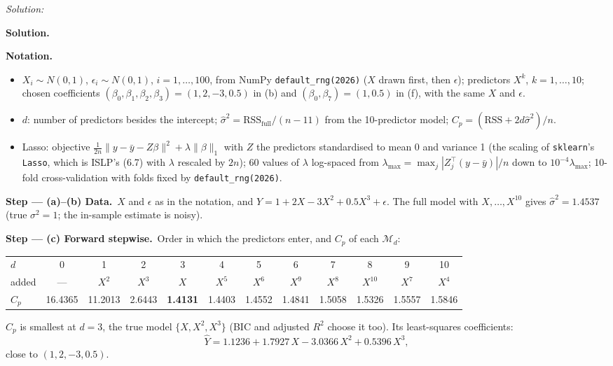 \documentclass[11pt,a4paper]{article}
\newif\ifsolucoes
\newcommand{\espacoresol}{4.5cm}   %
\numberwithin{equation}{questao}   %
\newenvironment{notacao}{\par\smallskip\noindent\textbf{Notation.}\begin{itemize}[leftmargin=1.4em,topsep=1pt,itemsep=0pt]\small}{\end{itemize}}
\newcommand{\resolespaco}{\ifsolucoes\else\par\textit{Solution:}\vspace{\espacoresol}\par\fi}
\newcommand{\passo}[2]{\par\smallskip\noindent\textbf{Step --- #1.}~#2}
\newcommand{\solhead}{\par\medskip\noindent{\color{blue!55!black}\rule{\linewidth}{0.3pt}}\par\noindent\textbf{Solution.}}
\begin{document}
\resolespaco
\begin{sol}
\solhead
\begin{notacao}
\item $X_i\sim N(0,1)$, $\epsilon_i\sim N(0,1)$, $i=1,\dots,100$, from NumPy \texttt{default\_rng(2026)}
  ($X$ drawn first, then $\epsilon$); predictors $X^k$, $k=1,\dots,10$; chosen coefficients
  $(\beta_0,\beta_1,\beta_2,\beta_3)=(1,2,-3,0.5)$ in (b) and $(\beta_0,\beta_7)=(1,0.5)$ in (f), with the
  same $X$ and $\epsilon$.
\item $d$: number of predictors besides the intercept; $\hat\sigma^2=\mathrm{RSS}_{\text{full}}/(n-11)$ from
  the 10-predictor model; $C_p=(\mathrm{RSS}+2d\hat\sigma^2)/n$.
\item Lasso: objective $\frac1{2n}\lVert y-\bar y-Z\beta\rVert^2+\lambda\lVert\beta\rVert_1$ with $Z$ the predictors
  standardised to mean 0 and variance 1 (the scaling of \texttt{sklearn}'s \texttt{Lasso}, which is
  ISLP's (6.7) with $\lambda$ rescaled by $2n$); 60 values of $\lambda$ log-spaced from
  $\lambda_{\max}=\max_j|Z_j^\top(y-\bar y)|/n$ down to $10^{-4}\lambda_{\max}$; 10-fold cross-validation
  with folds fixed by \texttt{default\_rng(2026)}.
\end{notacao}

\passo{(a)--(b) Data}{$X$ and $\epsilon$ as in the notation, and
$Y=1+2X-3X^2+0.5X^3+\epsilon$. The full model with $X,\dots,X^{10}$ gives $\hat\sigma^2=1.4537$
(true $\sigma^2=1$; the in-sample estimate is noisy).}

\passo{(c) Forward stepwise}{Order in which the predictors enter, and $C_p$ of each $\mathcal M_d$:}
\begin{center}\footnotesize\setlength{\tabcolsep}{2.6pt}
\begin{tabular}{lccccccccccc}
\toprule
$d$ & 0 & 1 & 2 & 3 & 4 & 5 & 6 & 7 & 8 & 9 & 10\\
added & --- & $X^2$ & $X^3$ & $X$ & $X^5$ & $X^6$ & $X^9$ & $X^8$ & $X^{10}$ & $X^7$ & $X^4$\\
$C_p$ & 16.4365 & 11.2013 & 2.6443 & \textbf{1.4131} & 1.4403 & 1.4552 & 1.4841 & 1.5058 & 1.5326 & 1.5557 & 1.5846\\
\bottomrule
\end{tabular}
\end{center}
$C_p$ is smallest at $d=3$, the true model $\{X,X^2,X^3\}$ (BIC and adjusted $R^2$ choose it too).
Its least-squares coefficients:
\[
\hat Y=1.1236+1.7927\,X-3.0366\,X^2+0.5396\,X^3 ,
\]
close to $(1,2,-3,0.5)$.


\end{sol}
\end{document}
